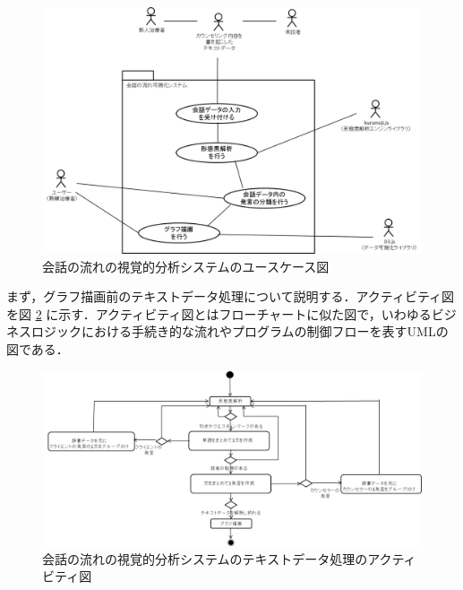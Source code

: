 \documentclass[shuuron]{kuee}
\begin{document}
\begin{figure}
  \begin{center}
    \includegraphics[width=\linewidth]{use_case_diagram.png}
  \end{center}
  \caption{会話の流れの視覚的分析システムのユースケース図}
  \label{fig:use_case_diagram}
\end{figure}


まず，グラフ描画前のテキストデータ処理について説明する．アクティビティ図を図
\ref{fig:activity}
に示す．アクティビティ図とはフローチャートに似た図で，いわゆるビジネスロジックにおける手続き的な流れやプログラムの制御フローを表すUMLの図である．
\begin{figure}
  \begin{center}
    \includegraphics[width=\linewidth]{activity.png}
  \end{center}
  \caption{会話の流れの視覚的分析システムのテキストデータ処理のアクティビティ図}
  \label{fig:activity}
\end{figure}
\end{document}
